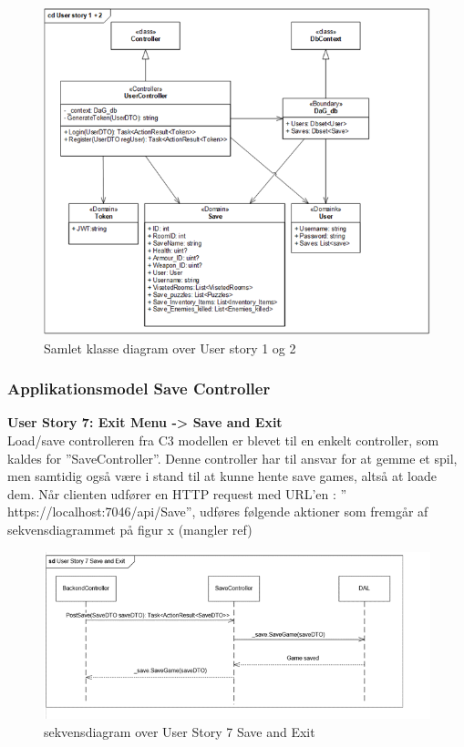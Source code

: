 \begin{figure}[H]
\centering
\includegraphics[width = \textwidth]{02-Body/Images/Backend_klasse_1_2.PNG}
\caption{Samlet klasse diagram over User story 1 og 2}
\label{fig:Design-Backend-Klasse-1-2}
\end{figure}

\subsubsection{Applikationsmodel Save Controller}
\textbf{User Story 7: Exit Menu -> Save and Exit}\\
Load/save controlleren fra C3 modellen er blevet til en enkelt controller, som kaldes for ”SaveController”. Denne controller har til ansvar for at gemme et spil, men samtidig også være i stand til at kunne hente save games, altså at loade dem.
Når clienten udfører en HTTP request med URL’en : ” https://localhost:7046/api/Save”, udføres følgende aktioner som fremgår af sekvensdiagrammet på figur x (mangler ref)\\

\begin{figure}[H]
\centering
\includegraphics[width = \textwidth]{02-Body/Images/Backend_sekvens_7.PNG}
\caption{sekvensdiagram over User Story 7 Save and Exit}
\label{fig:Design-Backend-Sekvens-7}
\end{figure}

